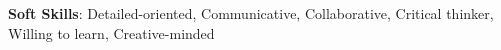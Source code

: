 \textbf{Soft Skills}: Detailed-oriented, Communicative, Collaborative, Critical thinker, Willing to learn, Creative-minded